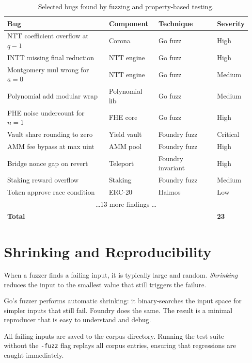 \documentclass[11pt,a4paper]{article}
\begin{document}
\begin{table}[H]
\centering
\small
\begin{tabular}{@{}llll@{}}
\toprule
\textbf{Bug} & \textbf{Component} & \textbf{Technique} & \textbf{Severity} \\
\midrule
NTT coefficient overflow at $q-1$ & Corona & Go fuzz & High \\
INTT missing final reduction & NTT engine & Go fuzz & High \\
Montgomery mul wrong for $a=0$ & NTT engine & Go fuzz & Medium \\
Polynomial add modular wrap & Polynomial lib & Go fuzz & Medium \\
FHE noise undercount for $n=1$ & FHE core & Go fuzz & High \\
Vault share rounding to zero & Yield vault & Foundry fuzz & Critical \\
AMM fee bypass at max uint & AMM pool & Foundry fuzz & High \\
Bridge nonce gap on revert & Teleport & Foundry invariant & High \\
Staking reward overflow & Staking & Foundry fuzz & Medium \\
Token approve race condition & ERC-20 & Halmos & Low \\
\multicolumn{4}{c}{\ldots 13 more findings \ldots} \\
\midrule
\textbf{Total} & & & \textbf{23} \\
\bottomrule
\end{tabular}
\caption{Selected bugs found by fuzzing and property-based testing.}
\end{table}

\section{Shrinking and Reproducibility}

When a fuzzer finds a failing input, it is typically large and random. \emph{Shrinking}
reduces the input to the smallest value that still triggers the failure.

Go's fuzzer performs automatic shrinking: it binary-searches the input space for simpler
inputs that still fail. Foundry does the same. The result is a minimal reproducer that
is easy to understand and debug.

All failing inputs are saved to the corpus directory. Running the test suite without the
\texttt{-fuzz} flag replays all corpus entries, ensuring that regressions are caught
immediately.
\end{document}
